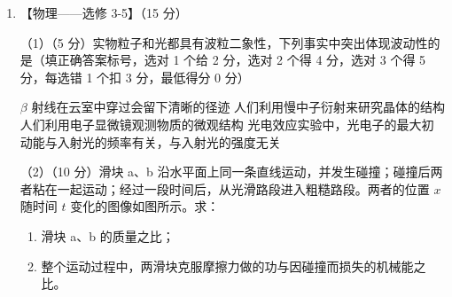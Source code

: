 \documentclass[\gkver]{gaokaozhenti}
\begin{document}
\begin{enumerate}
\begin{enumerate}
	\item
	P、Q 间的距离；

	\item
	从 $t=0$ 开始到平衡位置在 Q 处的质点第一次处于波峰位置时，波源在振动过程中通过的路程。
\end{enumerate}

\jdanswer{
\begin{enumerate}
	\item
	$133\Ucm$

	\item
	$125\Ucm$
\end{enumerate}
}

\item
【物理——选修 3-5】（15 分）

（1）（5 分）实物粒子和光都具有波粒二象性，下列事实中突出体现波动性的是（填正确答案标号，选对 1 个给 2 分，选对 2 个得 4 分，选对 3 个得 5 分，每选错 1 个扣 3 分，最低得分 0 分）

{$\beta$ 射线在云室中穿过会留下清晰的径迹}
{人们利用慢中子衍射来研究晶体的结构}
{人们利用电子显微镜观测物质的微观结构}
{光电效应实验中，光电子的最大初动能与入射光的频率有关，与入射光的强度无关}

（2）（10 分）滑块 a、b 沿水平面上同一条直线运动，并发生碰撞；碰撞后两者粘在一起运动；经过一段时间后，从光滑路段进入粗糙路段。两者的位置 $x$ 随时间 $t$ 变化的图像如图所示。求：

\begin{enumerate}
	\item
	滑块 a、b 的质量之比；

	\item
	整个运动过程中，两滑块克服摩擦力做的功与因碰撞而损失的机械能之比。
\end{enumerate}



\end{enumerate}
\end{document}
